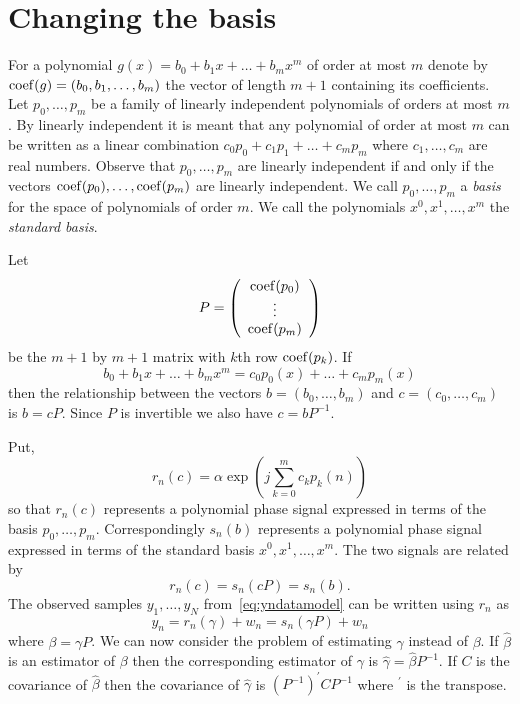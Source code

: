 \documentclass[5p]{elsarticle}
\begin{document}
\section{Changing the basis}\label{sec:changing-basis}

\newcommand{\calP}{{\mathcal P}}

For a polynomial $g(x) = b_0 + b_1 x + \dots + b_m x^m$ of order at most $m$ denote by $\operatorname{coef}(g) = (b_0, b_1, \dots, b_m)$ the vector of length $m+1$ containing its coefficients.  Let $p_0,\dots, p_m$ be a family of linearly independent polynomials of orders at most $m$.  By linearly independent it is meant that any polynomial of order at most $m$ can be written as a linear combination $c_0p_0 + c_1 p_1 + \dots + c_m p_m$ where $c_1, \dots, c_m$ are real numbers.  Observe that $p_0, \dots, p_m$ are linearly independent if and only if the vectors $\operatorname{coef}(p_0), \dots, \operatorname{coef}(p_m)$ are linearly independent.  We call $p_0, \dots, p_m$ a \emph{basis} for the space of polynomials of order $m$.  We call the polynomials $x^0, x^1, \dots, x^m$ the \emph{standard basis}.  

Let 
\[
P = \left( \begin{array}{c}
\operatorname{coef}(p_0) \\
\vdots \\
\operatorname{coef}(p_m)
\end{array} \right)
\] 
be the $m+1$ by $m+1$ matrix with $k$th row $\operatorname{coef}(p_k)$.  If
\[
b_0 + b_1 x + \dots + b_m x^m = c_0 p_0(x) + \dots + c_m p_m(x)
\]
then the relationship between the vectors $b =  (b_0, \dots, b_m)$ and $c =  (c_0, \dots, c_m)$ is $b = cP$.  Since $P$ is invertible we also have $c = bP^{-1}$.

Put,
\[
r_n(c) = \alpha \exp\left( j \sum_{k = 0}^{m}{c_k p_k(n)}\right)
\]
so that $r_n(c)$ represents a polynomial phase signal expressed in terms of the basis $p_0, \dots, p_m$.  Correspondingly $s_n(b)$ represents a polynomial phase signal expressed in terms of the standard basis $x^0, x^1, \dots, x^m$.  The two signals are related by
\[
r_n(c) = s_n(cP) = s_n(b).
\]
The observed samples $y_1,\dots,y_N$ from~\eqref{eq:yndatamodel} can be written using $r_n$ as
\[
y_n = r_n(\gamma) + w_n = s_n(\gamma P) + w_n
\]
where $\beta = \gamma P$.  We can now consider the problem of estimating $\gamma$ instead of $\beta$.  If $\hat{\beta}$ is an estimator of $\beta$ then the corresponding estimator of $\gamma$ is $\hat{\gamma} = \hat{\beta}P^{-1}$.  If $C$ is the covariance of $\hat{\beta}$ then the covariance of $\hat{\gamma}$ is $(P^{-1})^\prime C P^{-1}$ where $^\prime$ is the transpose.
\end{document}
